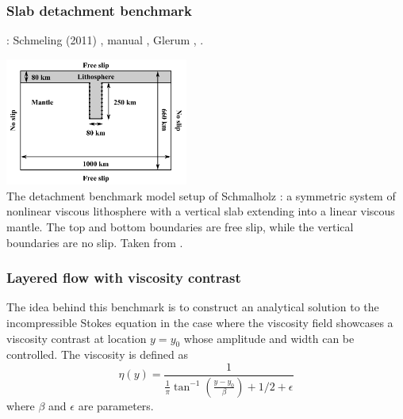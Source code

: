 \subsubsection{Slab detachment benchmark} \label{sec:slabdetach}

\Literature: Schmeling (2011) \cite{schm11}, \aspect manual \cite{aspectmanual}, Glerum \etal \cite{gltf18}, 
.

\begin{center}
\includegraphics[width=6cm]{images/benchmark_slabdetach/gltf18}\\
{\captionfont The detachment benchmark model setup of Schmalholz \cite{schm11}: 
a symmetric system of nonlinear viscous lithosphere with a vertical slab extending into a linear 
viscous mantle. The top and bottom boundaries are free slip, while the vertical boundaries are no slip.
Taken from \cite{gltf18}.}
\end{center}

\subsubsection{Layered flow with viscosity contrast} \label{sec:layfl}

The idea behind this benchmark is to construct an analytical solution to the incompressible
Stokes equation in the case where the viscosity field showcases a 
viscosity contrast at location $y=y_0$ whose amplitude and width can be controlled. 
The viscosity is defined as
\[
\eta(y)=\frac{1}{\frac{1}{\pi} \tan^{-1} (\frac{y-y_0}{\beta} ) + 1/2 + \epsilon}
\]
where $\beta$ and $\epsilon$ are parameters. 

